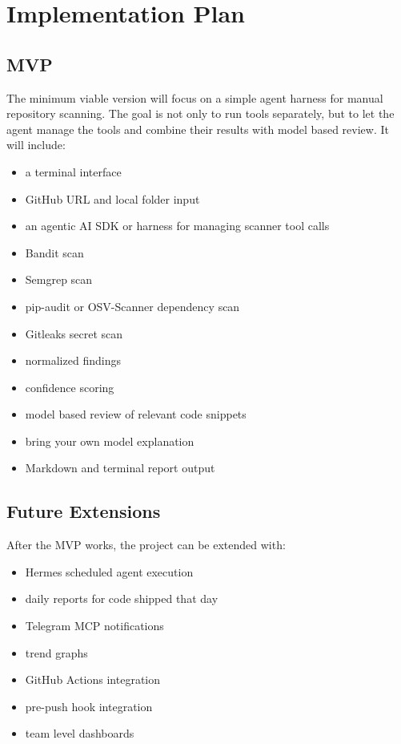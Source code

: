 \documentclass[
    numbers=noenddot,
    parskip=half-,
    fontsize=11pt,
    paper=a4,
    oneside,
    titlepage,
    bibliography=totoc,
    chapterprefix=false
]{scrbook}
\begin{document}
\chapter{Implementation Plan}

\section{MVP}

The minimum viable version will focus on a simple agent harness for manual repository scanning. The goal is not only to run tools separately, but to let the agent manage the tools and combine their results with model based review. It will include:

\begin{itemize}
    \item a terminal interface
    \item GitHub URL and local folder input
    \item an agentic AI SDK or harness for managing scanner tool calls
    \item Bandit scan
    \item Semgrep scan
    \item pip-audit or OSV-Scanner dependency scan
    \item Gitleaks secret scan
    \item normalized findings
    \item confidence scoring
    \item model based review of relevant code snippets
    \item bring your own model explanation
    \item Markdown and terminal report output
\end{itemize}

\section{Future Extensions}

After the MVP works, the project can be extended with:

\begin{itemize}
    \item Hermes scheduled agent execution
    \item daily reports for code shipped that day
    \item Telegram MCP notifications
    \item trend graphs
    \item GitHub Actions integration
    \item pre-push hook integration
    \item team level dashboards
\end{itemize}
\end{document}
